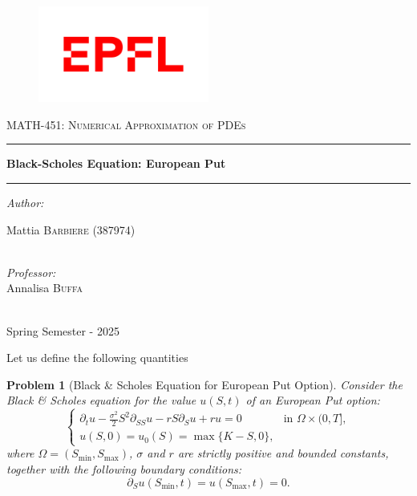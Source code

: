 \documentclass{article}
\newtheorem{problem}{Problem}[section]
\begin{document}
\thispagestyle{empty}

\begin{figure}
\centering
\includegraphics[width=0.5\textwidth]{code/images/LOGO.png}
\end{figure}
\vspace{0.5cm}
\begin{center}
\textsc{ \Large MATH-451: Numerical Approximation of PDEs}
\vspace{1.5cm}
\hrule
\vspace{0.5cm}
{\huge \bfseries Black-Scholes Equation: European Put}
\vspace{0.5cm}
\hrule
\vspace{1.5cm}


\emph{\Large \centering Author:}\\
\vspace{0.3cm}

\large Mattia \textsc{\large Barbiere} (387974)\\

~

\vspace{0.5cm}


\emph{\Large \centering Professor:}\\
\vspace{0.3cm}
\large  Annalisa  \textsc{\large Buffa}\\
~

\vspace{0.5cm}

\large Spring Semester - 2025

\end{center}

\clearpage
{}

Let us define the following quantities
\begin{problem}[Black \& Scholes Equation for European Put Option]\label{def:problem}
Consider the Black \& Scholes equation for the value \( u(S, t) \) of an European Put option:
\[
\begin{cases}
\partial_t u - \frac{\sigma^2}{2} S^2 \partial_{SS} u - r S \partial_S u + r u = 0 & \text{in } \Omega \times (0, T], \\
u(S, 0) = u_0(S) = \max \{ K - S, 0 \},
\end{cases}
\]
where \(\Omega = (S_{\min}, S_{\max})\), \(\sigma\) and \(r\) are strictly positive and bounded constants, together with the following boundary conditions:
\[
\partial_S u(S_{\min}, t) = u(S_{\max}, t) = 0.
\]
\end{problem}
\end{document}
